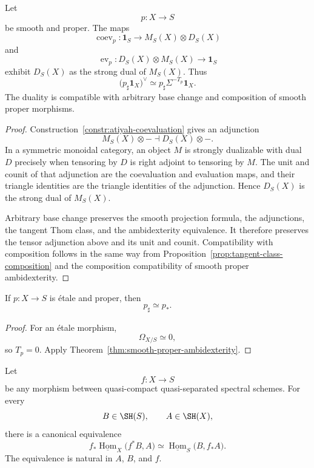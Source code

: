 \begin{theorem}
\label{thm:motivic-atiyah-duality}
Let
\[
    p:X\longrightarrow S
\]
be smooth and proper.  The maps
\[
    \operatorname{coev}_p:
    \mathbf1_S
    \longrightarrow
    M_S(X)\otimes D_S(X)
\]
and
\[
    \operatorname{ev}_p:
    D_S(X)\otimes M_S(X)
    \longrightarrow
    \mathbf1_S
\]
exhibit \(D_S(X)\) as the strong dual of \(M_S(X)\).  Thus
\[
    \bigl(
      p_\sharp\mathbf1_X
    \bigr)^\vee
    \simeq
    p_\sharp\Sigma^{-T_p}\mathbf1_X.
\]
The duality is compatible with arbitrary base change and composition of
smooth proper morphisms.
\end{theorem}

\begin{proof}
Construction~\ref{constr:atiyah-coevaluation} gives an adjunction
\[
    M_S(X)\otimes-
    \dashv
    D_S(X)\otimes-.
\]
In a symmetric monoidal category, an object \(M\) is strongly dualizable with
dual \(D\) precisely when tensoring by \(D\) is right adjoint to tensoring by
\(M\).  The unit and counit of that adjunction are the coevaluation and
evaluation maps, and their triangle identities are the triangle identities
of the adjunction.  Hence \(D_S(X)\) is the strong dual of \(M_S(X)\).

Arbitrary base change preserves the smooth projection formula, the
adjunctions, the tangent Thom class, and the ambidexterity equivalence.
It therefore preserves the tensor adjunction above and its unit and counit.
Compatibility with composition follows in the same way from
Proposition~\ref{prop:tangent-class-composition} and the composition
compatibility of smooth proper ambidexterity.
\end{proof}

\begin{corollary}
\label{cor:etale-proper-ambidexterity}
If \(p:X\to S\) is \'{e}tale and proper, then
\[
    p_\sharp
    \simeq
    p_*.
\]
\end{corollary}

\begin{proof}
For an \'{e}tale morphism,
\[
    \Omega_{X/S}\simeq0,
\]
so \(T_p=0\).  Apply
Theorem~\ref{thm:smooth-proper-ambidexterity}.
\end{proof}

\begin{proposition}
\label{prop:arbitrary-direct-image-internal-hom}
Let
\[
    f:X\longrightarrow S
\]
be any morphism between quasi-compact quasi-separated spectral schemes.  For
every
\[
    B\in\SH(S),
    \qquad
    A\in\SH(X),
\]
there is a canonical equivalence
\[
    f_*
    \underline{\operatorname{Hom}}_X
    \bigl(
      f^*B,
      A
    \bigr)
    \simeq
    \underline{\operatorname{Hom}}_S
    \bigl(
      B,
      f_*A
    \bigr).
\]
The equivalence is natural in \(A\), \(B\), and \(f\).
\end{proposition}

